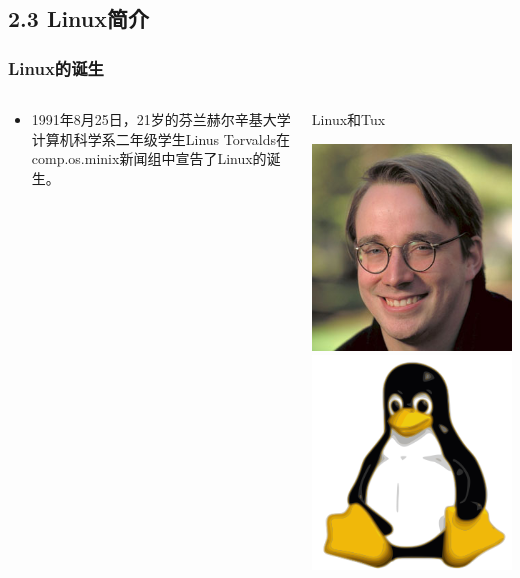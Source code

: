 \documentclass[xcolor=svgnames,presentation]{beamer}
\begin{document}
\subsection{2.3 Linux简介}
\label{sec-2-3}
\begin{frame}
\frametitle{Linux的诞生}
\label{sec-2-3-1}
\begin{columns}
\begin{column}{0.5\textwidth}
\label{sec-2-3-1-1}
\begin{itemize}

\item 1991年8月25日，21岁的芬兰赫尔辛基大学计算机科学系二年级学生Linus Torvalds在comp.os.minix新闻组中宣告了Linux的诞生。
\label{sec-2-3-1-2}%
\end{itemize} %
\end{column}
\begin{column}{0.5\textwidth}
\begin{exampleblock}{Linux和Tux}
\label{sec-2-3-1-3}

\includegraphics[width=.5\textwidth]{img/linus.jpg}
\includegraphics[width=.5\textwidth]{img/tux.jpg}
\end{exampleblock}
\end{column}
\end{columns}
\end{frame}
\end{document}
